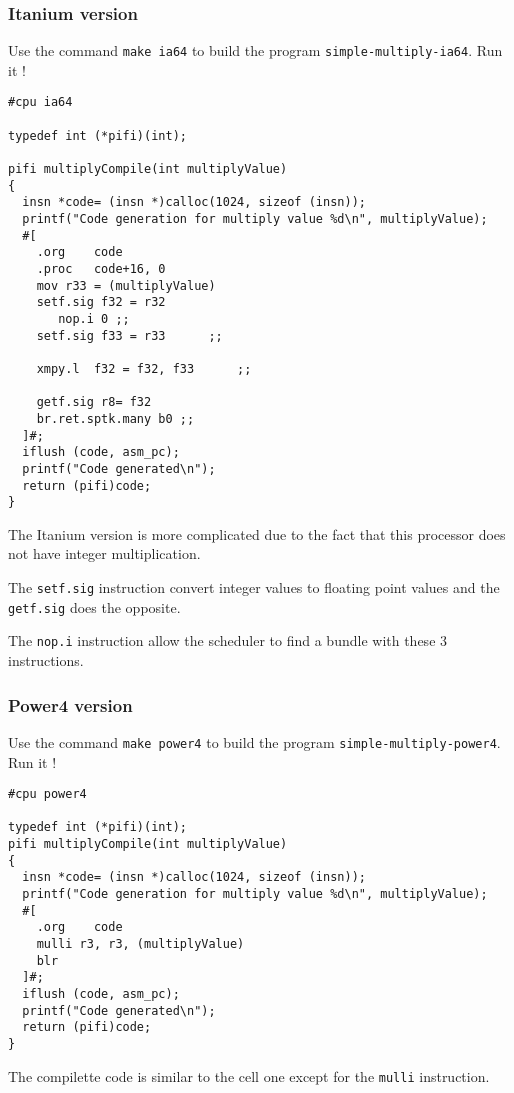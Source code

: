 \documentclass{article}
\begin{document}
\subsubsection{Itanium version}

Use the command \texttt{make ia64} to build the program
\texttt{simple-multiply-ia64}. Run it !

\begin{lstlisting}
#cpu ia64

typedef int (*pifi)(int);

pifi multiplyCompile(int multiplyValue)
{
  insn *code= (insn *)calloc(1024, sizeof (insn));
  printf("Code generation for multiply value %d\n", multiplyValue);
  #[
	.org	code
	.proc   code+16, 0
	mov	r33 = (multiplyValue)   
	setf.sig f32 = r32
	   nop.i 0 ;;
	setf.sig f33 = r33		;;

	xmpy.l  f32 = f32, f33 		;;

	getf.sig r8= f32
	br.ret.sptk.many b0 ;;
  ]#;
  iflush (code, asm_pc);
  printf("Code generated\n");
  return (pifi)code;
}
\end{lstlisting}

The Itanium version is more complicated due to the fact that this
processor does not have integer multiplication.

The \texttt{setf.sig} instruction convert integer values to floating
point values and the \texttt{getf.sig} does the opposite.

The \texttt{nop.i} instruction allow the scheduler to find a bundle
with these 3 instructions.

\subsubsection{Power4 version}

Use the command \texttt{make power4} to build the program
\texttt{simple-multiply-power4}. Run it !

\begin{lstlisting}
#cpu power4

typedef int (*pifi)(int);
pifi multiplyCompile(int multiplyValue)
{
  insn *code= (insn *)calloc(1024, sizeof (insn));
  printf("Code generation for multiply value %d\n", multiplyValue);
  #[
	.org	code
	mulli r3, r3, (multiplyValue)  
	blr
  ]#;
  iflush (code, asm_pc);
  printf("Code generated\n");
  return (pifi)code;
}
\end{lstlisting}

The compilette code is similar to the cell one except for the
\texttt{mulli} instruction.
\end{document}
